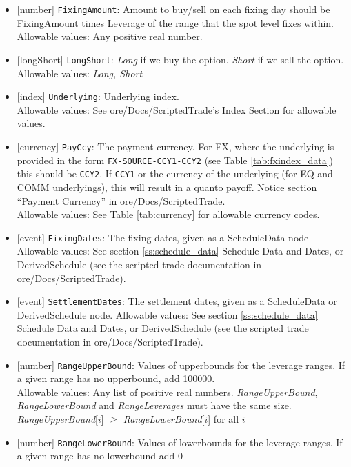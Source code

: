 \begin{itemize}
    \item{}[number] \lstinline!FixingAmount!: Amount to buy/sell on each fixing day should be FixingAmount times Leverage of the range that the spot level fixes within. \\
    Allowable values: Any positive real number.
    \item{}[longShort] \lstinline!LongShort!: \emph{Long} if we buy the option. \emph{Short} if we sell the option.
    Allowable values: \emph{Long, Short}
    \item{}[index] \lstinline!Underlying!: Underlying index. \\
    Allowable values: See ore/Docs/ScriptedTrade's Index Section for allowable values.
    \item{}[currency] \lstinline!PayCcy!: The payment currency. For FX, where the underlying is provided
      in the form \lstinline!FX-SOURCE-CCY1-CCY2! (see Table \ref{tab:fxindex_data}) this should
      be \lstinline!CCY2!. If \lstinline!CCY1! or the currency of the underlying (for EQ and
      COMM underlyings), this will result in a quanto payoff. Notice section ``Payment Currency'' in ore/Docs/ScriptedTrade. \\
        Allowable values: See Table \ref{tab:currency} for allowable currency codes.
    \item{}[event] \lstinline!FixingDates!: The fixing dates, given as a ScheduleData node \\
    Allowable values: See section \ref{ss:schedule_data} Schedule Data and Dates, or DerivedSchedule (see the scripted trade documentation in ore/Docs/ScriptedTrade).
    \item{}[event] \lstinline!SettlementDates!: The settlement dates, given as a ScheduleData or DerivedSchedule node.
    Allowable values: See section \ref{ss:schedule_data} Schedule Data and Dates, or DerivedSchedule (see the scripted trade documentation in ore/Docs/ScriptedTrade).
    \item{}[number] \lstinline!RangeUpperBound!: Values of upperbounds for the leverage ranges. If a given range has no upperbound, add 100000. \\
    Allowable values: Any list of positive real numbers. \emph{RangeUpperBound}, \emph{RangeLowerBound} and \emph{RangeLeverages} must have the same size. \emph{RangeUpperBound}[$i$] $\ge$ \emph{RangeLowerBound}[$i$] for all $i$
    \item{}[number] \lstinline!RangeLowerBound!: Values of lowerbounds for the leverage ranges. If a given range has no lowerbound add 0 \\

\end{itemize}

